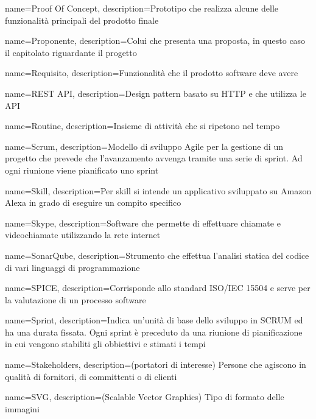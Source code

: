 {
	name={Proof Of Concept},
	description={Prototipo che realizza alcune delle funzionalità principali del prodotto finale}
}

{
	name={Proponente},
	description={Colui che presenta una proposta, in questo caso il capitolato riguardante il progetto}
	{\pagebreak}
}

{
	name={Requisito},
	description={Funzionalità che il prodotto software deve avere}
}

{
	name={REST API},
	description={Design pattern basato su HTTP e che utilizza le API}
}

{
	name={Routine},
	description={Insieme di attività che si ripetono nel tempo}
	{\pagebreak}
}

{
	name={Scrum},
	description={Modello di sviluppo Agile per la gestione di un progetto che prevede che l’avanzamento avvenga tramite una serie di sprint. Ad ogni riunione viene pianificato uno sprint}
}

{
	name={Skill},
	description={Per skill si intende un applicativo sviluppato su Amazon Alexa in grado di eseguire un compito specifico}
}

{
	name={Skype},
	description={Software che permette di effettuare chiamate e videochiamate utilizzando la rete internet}
}

{
	name={SonarQube},
	description={Strumento che effettua l’analisi statica del codice di vari linguaggi di programmazione}
}

{
	name={SPICE},
	description={Corrisponde allo standard ISO/IEC 15504 e serve per la valutazione di un processo software}
}

{
	name={Sprint},
	description={Indica un’unità di base dello sviluppo in SCRUM ed ha una durata fissata. Ogni sprint è preceduto da una riunione di pianificazione in cui vengono stabiliti gli obbiettivi e stimati i tempi}
}

{
	name={Stakeholders},
	description={(portatori di interesse) Persone che agiscono in qualità di fornitori, di committenti o di clienti}
}

{
	name={SVG},
	description={(Scalable Vector Graphics) Tipo di formato delle immagini}
}

